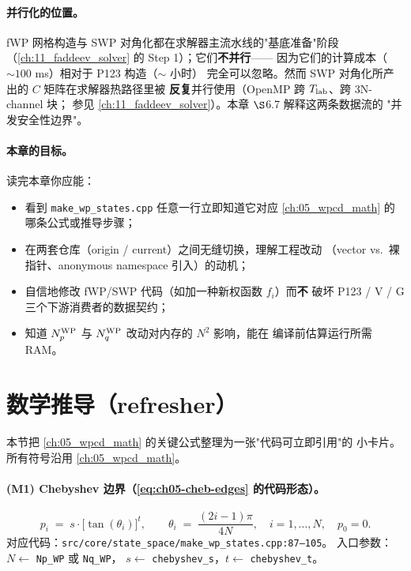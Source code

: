 \paragraph{并行化的位置。}
fWP 网格构造与 SWP 对角化都在求解器主流水线的"基底准备"阶段
（\cref{ch:11_faddeev_solver} 的 Step 1）；它们\textbf{不并行}——
因为它们的计算成本（\(\sim 100\) ms）相对于 P123 构造（\(\sim\) 小时）
完全可以忽略。然而 SWP 对角化所产出的 \(C\) 矩阵在求解器热路径里被
\textbf{反复}并行使用（OpenMP 跨 \({T_{\text{lab}}}\)、跨 3N-channel 块；
参见 \cref{ch:11_faddeev_solver}）。本章 \(\S\)6.7 解释这两条数据流的
"并发安全性边界"。

\paragraph{本章的目标。}
读完本章你应能：
\begin{itemize}
  \item 看到 \texttt{make\_wp\_states.cpp} 任意一行立即知道它对应
        \cref{ch:05_wpcd_math} 的哪条公式或推导步骤；
  \item 在两套仓库（origin / current）之间无缝切换，理解工程改动
        （vector vs.~裸指针、anonymous namespace 引入）的动机；
  \item 自信地修改 fWP/SWP 代码（如加一种新权函数 \(f_i\)）而\textbf{不}
        破坏 P123 / V / G 三个下游消费者的数据契约；
  \item 知道 \({N_{p}^{\text{WP}}}\) 与 \({N_{q}^{\text{WP}}}\) 改动对内存的 \(N^2\) 影响，能在
        编译前估算运行所需 RAM。
\end{itemize}

\section{数学推导（refresher）}
\label{sec:ch06-math}

本节把 \cref{ch:05_wpcd_math} 的关键公式整理为一张"代码可立即引用"的
小卡片。所有符号沿用 \cref{ch:05_wpcd_math}。

\paragraph{(M1) Chebyshev 边界（\cref{eq:ch05-cheb-edges} 的代码形态）。}
\begin{equation}
\label{eq:ch06-cheb-edge-code}
p_i \;=\; s \cdot \bigl[\tan(\theta_i)\bigr]^t,
\qquad
\theta_i \;=\; \frac{(2i - 1)\pi}{4N},
\quad
i = 1, \ldots, N,
\quad
p_0 = 0.
\end{equation}
对应代码：\texttt{src/core/state\_space/make\_wp\_states.cpp:87--105}。
入口参数：\(N \leftarrow\) \texttt{Np\_WP} 或 \texttt{Nq\_WP}，
\(s \leftarrow\) \texttt{chebyshev\_s}，\(t \leftarrow\) \texttt{chebyshev\_t}。

